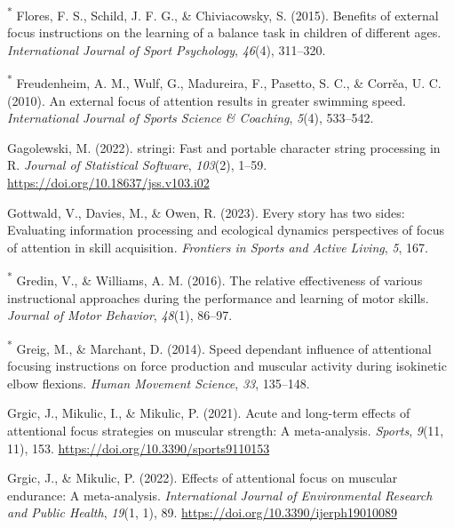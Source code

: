 \documentclass[
  man, donotrepeattitle,floatsintext]{apa7}
\newlength{\cslhangindent}
\newlength{\cslentryspacingunit} %
\newenvironment{CSLReferences}[2] %
 {%
  \setlength{\parindent}{0pt}
  \ifodd #1
  \let\oldpar\par
  \def\par{\hangindent=\cslhangindent\oldpar}
  \fi
  \setlength{\parskip}{#2\cslentryspacingunit}
 }%
 {}
\begin{document}
\begin{CSLReferences}{1}{0}
\leavevmode{}%
\textsuperscript{*} Flores, F. S., Schild, J. F. G., \& Chiviacowsky, S. (2015). Benefits of external focus instructions on the learning of a balance task in children of different ages. \emph{International Journal of Sport Psychology}, \emph{46}(4), 311--320.

\leavevmode{}%
\textsuperscript{*} Freudenheim, A. M., Wulf, G., Madureira, F., Pasetto, S. C., \& Corrěa, U. C. (2010). An external focus of attention results in greater swimming speed. \emph{International Journal of Sports Science \& Coaching}, \emph{5}(4), 533--542.

\leavevmode{}%
Gagolewski, M. (2022). {stringi}: {F}ast and portable character string processing in {R}. \emph{Journal of Statistical Software}, \emph{103}(2), 1--59. \url{https://doi.org/10.18637/jss.v103.i02}

\leavevmode{}%
Gottwald, V., Davies, M., \& Owen, R. (2023). Every story has two sides: {Evaluating} information processing and ecological dynamics perspectives of focus of attention in skill acquisition. \emph{Frontiers in Sports and Active Living}, \emph{5}, 167.

\leavevmode{}%
\textsuperscript{*} Gredin, V., \& Williams, A. M. (2016). The relative effectiveness of various instructional approaches during the performance and learning of motor skills. \emph{Journal of Motor Behavior}, \emph{48}(1), 86--97.

\leavevmode{}%
\textsuperscript{*} Greig, M., \& Marchant, D. (2014). Speed dependant influence of attentional focusing instructions on force production and muscular activity during isokinetic elbow flexions. \emph{Human Movement Science}, \emph{33}, 135--148.

\leavevmode{}%
Grgic, J., Mikulic, I., \& Mikulic, P. (2021). Acute and long-term effects of attentional focus strategies on muscular strength: {A} meta-analysis. \emph{Sports}, \emph{9}(11, 11), 153. \url{https://doi.org/10.3390/sports9110153}

\leavevmode{}%
Grgic, J., \& Mikulic, P. (2022). Effects of attentional focus on muscular endurance: {A} meta-analysis. \emph{International Journal of Environmental Research and Public Health}, \emph{19}(1, 1), 89. \url{https://doi.org/10.3390/ijerph19010089}


\end{CSLReferences}
\end{document}
